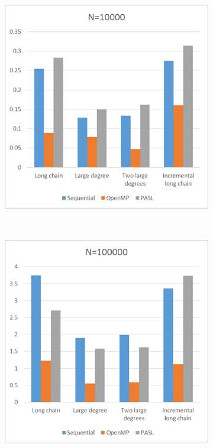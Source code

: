 \documentclass[specification,annotation]{itmo-student-thesis}
\begin{document}
\begin{figure}[!ht]
\centering
\begin{subfigure}[b]{0.45\textwidth}
    \includegraphics[width=\textwidth]{pic/results-4-a.png}
\end{subfigure}~~\begin{subfigure}[b]{0.45\textwidth}
    \includegraphics[width=\textwidth]{pic/results-4-b.png}

\end{subfigure}
\end{figure}
\end{document}
